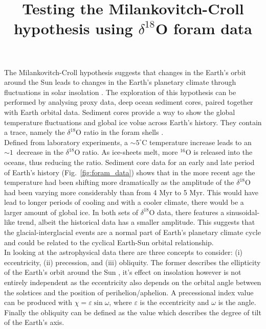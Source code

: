 \documentclass[12pt, onecolumn]{revtex4}    %
\begin{document}
                     

\title{Testing the Milankovitch-Croll hypothesis using $\delta^{18}$O foram data} 
\maketitle

\vspace{-4ex}

The Milankovitch-Croll hypothesis suggests that changes in the Earth's orbit around the Sun leads to changes in the Earth's planetary climate through fluctuations in solar insolation \cite{ruddiman_climate}. The exploration of this hypothesis can be performed by analysing proxy data, deep ocean sediment cores, paired together with Earth orbital data. Sediment cores provide a way to show the global temperature fluctuations and global ice volue across Earth's history. They contain a trace, namely the $\delta^{18}$O ratio in the foram shells \cite{droxler_climate}. \\

Defined from laboratory experiments, a $\sim 5^{\circ}\mathrm{C}$ temperature increase leads to an $\sim 1$\textperthousand\ decrease in the $\delta^{18}$O ratio. As ice-sheets melt, more $^{16}$O is released into the oceans, thus reducing the ratio. Sediment core data for an early and late period of Earth's history (Fig.~\ref{fig:foram_data}) shows that in the more recent age the temperature had been shifting more dramatically as the amplitude of the $\delta^{18}$O had been varying more considerably than from 4 Myr to 5 Myr. This would have lead to longer periods of cooling and with a cooler climate, there would be a larger amount of global ice. In both sets of $\delta^{18}$O data, there features a sinusoidal-like trend, albeit the historical data has a smaller amplitude. This suggests that the glacial-interglacial events are a normal part of Earth's planetary climate cycle and could be related to the cyclical Earth-Sun orbital relationship. \\

In looking at the astrophysical data there are three concepts to consider: (i) eccentricity, (ii) precession, and (iii) obliquity. The former describes the ellipticity of the Earth's orbit around the Sun \cite{carroll_astro}, it's effect on insolation however is not entirely independent as the eccentricity also depends on the orbital angle between the solstices and the position of perihelion/aphelion. A precessional index value can be produced with $\chi= \varepsilon \sin{\omega}$, where $\varepsilon$ is the eccentricity and $\omega$ is the angle. Finally the obliquity can be defined as the value which describes the degree of tilt of the Earth's axis. \\
\end{document}
